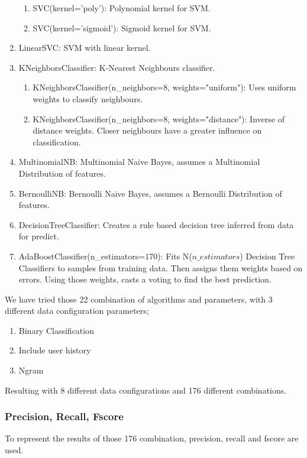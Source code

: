 \documentclass[twoside,11pt]{article}
\begin{document}
\begin{enumerate}
\begin{enumerate}
\item SVC(kernel='poly'): Polynomial kernel for SVM.
\item SVC(kernel='sigmoid'): Sigmoid kernel for SVM.
\end{enumerate}
\item LinearSVC: SVM with linear kernel.
\item KNeighborsClassifier: K-Nearest Neighbours classifier.
\begin{enumerate}
\item KNeighborsClassifier(n\_neighbors=8, weights="uniform"): Uses uniform weights to classify neighbours.
\item KNeighborsClassifier(n\_neighbors=8, weights="distance"): Inverse of distance weights. Closer neighbours have a greater influence on classification.
\end{enumerate}
\item MultinomialNB: Multinomial Naive Bayes, assumes a Multinomial Distribution of features.
\item BernoulliNB: Bernoulli Naive Bayes, assumes a Bernoulli Distribution of features.
\item DecisionTreeClassifier: Creates a rule based decision tree inferred from data for predict.
\item AdaBoostClassifier(n\_estimators=170): Fits N($n\_estimators$) Decision Tree Classifiers to samples from training data. Then assigns them weights based on errors. Using those weights, casts a voting to find the best prediction.
\end{enumerate}
\normalsize
We have tried those 22 combination of algorithms and parameters, with 3 different data configuration parameters; 
\footnotesize
\begin{enumerate}
\item Binary Classification
\item Include user history
\item Ngram
\end{enumerate}
\normalsize

Resulting with 8 different data configurations and 176 different combinations.

\subsubsection{Precision, Recall, Fscore}
To represent the results of those 176 combination, precision, recall and fscore are used.
\end{document}
